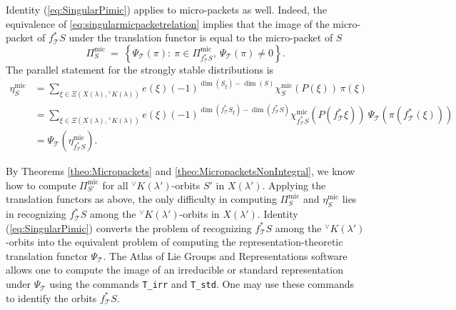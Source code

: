 \documentclass[a4paper, 11pt]{article}
\begin{document}
Identity (\ref{eq:SingularPimic}) applies to micro-packets as well.
Indeed, the equivalence of \eqref{eq:singularmicpacketrelation}
implies that the image of the micro-packet of
\(f^{\ast}_\mathcal{T}S\)  under the translation functor is equal to
the micro-packet of \(S\)  
\begin{equation}\label{eq:Singularetamic}
\Pi_{S}^{\mathrm{mic}}\ =\ \left\{\Psi_\mathcal{T}(\pi):\ \pi\in 
\Pi_{f^{\ast}_\mathcal{T}S}^{\mathrm{mic}},\ \Psi_\mathcal{T}(\pi)\neq 0 \right\}.
\end{equation}
The parallel statement for the strongly stable distributions is
\begin{align}
\label{singetamic}
\eta_{S}^{\mathrm{mic}}&=\sum_{\xi\in \Xi(X(\lambda),{}^{\vee}K(\lambda))}
e(\xi)(-1)^{\dim(S_\xi)-\dim(S)}\chi_{S}^{\mathrm{mic}}(P(\xi)) \,\pi(\xi)\\
\nonumber &=\sum_{\xi\in \Xi(X(\lambda),{}^{\vee}K(\lambda))}
e(\xi)(-1)^{\dim(f^{\ast}_{\mathcal{T}}S_\xi)-\dim(f^{\ast}_{\mathcal{T}}S)}
\chi_{f^{\ast}_{\mathcal{T}}S}^{\mathrm{mic}}(P(f^{\ast}_{\mathcal{T}}\xi)) \ 
\Psi_{\mathcal{T}}(\pi(f^{\ast}_\mathcal{T}(\xi))) \\
\nonumber &=\Psi_{\mathcal{T}}(\eta_{f^{\ast}_{\mathcal{T}}S}^{\mathrm{mic}}).
\end{align}

By Theorems \ref{theo:Micropackets} and
\ref{theo:MicropacketsNonIntegral}, we know how to compute
\(\Pi_{S'}^{\mathrm{mic}}\) for all \({}^{\vee}K(\lambda')\)-orbits
\(S'\) in \(X(\lambda')\).  Applying the translation functors as
above, the only difficulty in computing 
\(\Pi_{S}^{\mathrm{mic}}\) and \(\eta_{S}^{\mathrm{mic}}\) lies in
recognizing \(f^{\ast}_{\mathcal{T}}S\) among the 
\({}^{\vee}K(\lambda')\)-orbits in \(X(\lambda')\).
Identity (\ref{eq:SingularPimic}) converts the problem of recognizing
\(f^{\ast}_{\mathcal{T}}S\) among the  
\({}^{\vee}K(\lambda')\)-orbits into the equivalent
problem of computing the representation-theoretic
translation functor $\Psi_{\mathcal{T}}$.
The Atlas of Lie Groups and Representations software allows
one to compute  the image of an
irreducible or standard representation under $\Psi_{\mathcal{T}}$
using the commands \texttt{T\_irr} and \texttt{T\_std}.  One may 
use these commands to identify the orbits $f_\mathcal{T}^{\ast}S$.
\end{document}
